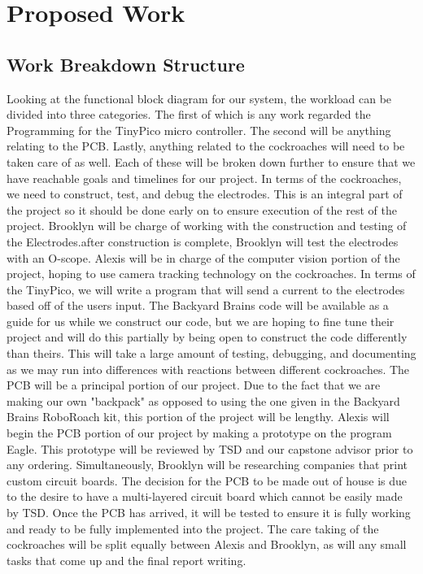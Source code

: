 \documentclass{article}
\begin{document}
\section{Proposed Work}

\subsection{Work Breakdown Structure}
Looking at the functional block diagram for our system, the workload can be divided into three categories. The first of which is any work regarded the Programming for the TinyPico micro controller. The second will be anything relating to the PCB. Lastly, anything related to the cockroaches will need to be taken care of as well. Each of these will be broken down further to ensure that we have reachable goals and timelines for our project. In terms of the cockroaches, we need to construct, test, and debug the electrodes. This is an integral part of the project so it should be done early on to ensure execution of the rest of the project. Brooklyn will be charge of working with the construction and testing of the Electrodes.after construction is complete, Brooklyn will test the electrodes with an O-scope. Alexis will be in charge of the computer vision portion of the project, hoping to use camera tracking technology on the cockroaches. In terms of the TinyPico, we will write a program that will send a current to the electrodes based off of the users input. The Backyard Brains code will be available as a guide for us while we construct our code, but we are hoping to fine tune their project and will do this partially by being open to construct the code differently than theirs. This will take a large amount of testing, debugging, and documenting as we may run into differences with reactions between different cockroaches. The PCB will be a principal portion of our project. Due to the fact that we are making our own "backpack" as opposed to using the one given in the Backyard Brains RoboRoach kit, this portion of the project will be lengthy. Alexis will begin the PCB portion of our project by making a prototype on the program Eagle. This prototype will be reviewed by TSD and our capstone advisor prior to any ordering. Simultaneously, Brooklyn will be researching companies that print custom circuit boards. The decision for the PCB to be made out of house is due to the desire to have a multi-layered circuit board which cannot be easily made by TSD. Once the PCB has arrived, it will be tested to ensure it is fully working and ready to be fully implemented into the project. The care taking of the cockroaches will be split equally between Alexis and Brooklyn, as will any small tasks that come up and the final report writing.  
\end{document}
